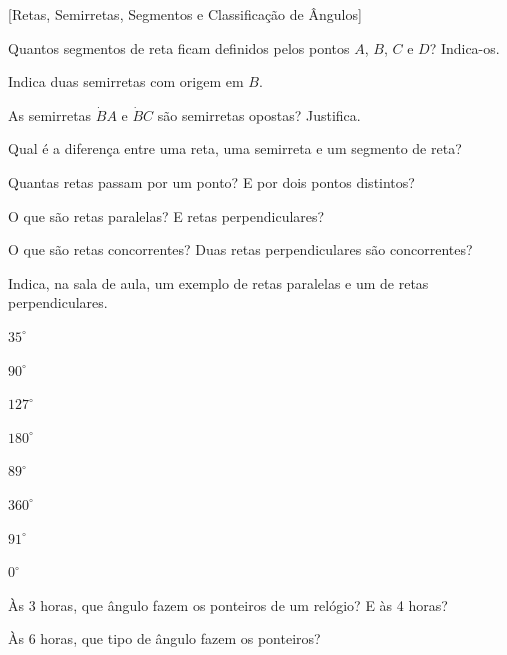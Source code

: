 \documentclass[12pt]{article}
\begin{document}
[Retas, Semirretas, Segmentos e Classificação de Ângulos]



\begin{center}
\end{center}

\begin{exercicios}
  \item Quantos segmentos de reta ficam definidos pelos pontos $A$, $B$, $C$ e $D$? Indica-os.
  \item Indica duas semirretas com origem em $B$.
  \item As semirretas $\dot{B}A$ e $\dot{B}C$ são semirretas opostas? Justifica.
  \item Qual é a diferença entre uma reta, uma semirreta e um segmento de reta?
  \item Quantas retas passam por um ponto? E por dois pontos distintos?
  \item O que são retas paralelas? E retas perpendiculares?
  \item O que são retas concorrentes? Duas retas perpendiculares são concorrentes?
  \item Indica, na sala de aula, um exemplo de retas paralelas e um de retas perpendiculares.
\end{exercicios}

\begin{exercicios}
  \item $35^\circ$
  \item $90^\circ$
  \item $127^\circ$
  \item $180^\circ$
  \item $89^\circ$
  \item $360^\circ$
  \item $91^\circ$
  \item $0^\circ$
  \item Às 3 horas, que ângulo fazem os ponteiros de um relógio? E às 4 horas?
  \item Às 6 horas, que tipo de ângulo fazem os ponteiros?
\end{exercicios}
\end{document}

